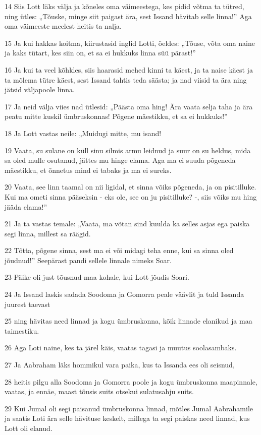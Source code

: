 \par 14 Siis Lott läks välja ja kõneles oma väimeestega, kes pidid võtma ta tütred, ning ütles: „Tõuske, minge siit paigast ära, sest Issand hävitab selle linna!” Aga oma väimeeste meelest heitis ta nalja.
\par 15 Ja kui hakkas koitma, kiirustasid inglid Lotti, öeldes: „Tõuse, võta oma naine ja kaks tütart, kes siin on, et sa ei hukkuks linna süü pärast!”
\par 16 Ja kui ta veel kõhkles, siis haarasid mehed kinni ta käest, ja ta naise käest ja ta mõlema tütre käest, sest Issand tahtis teda säästa; ja nad viisid ta ära ning jätsid väljapoole linna.
\par 17 Ja neid välja viies nad ütlesid: „Päästa oma hing! Ära vaata selja taha ja ära peatu mitte kuskil ümbruskonnas! Põgene mäestikku, et sa ei hukkuks!”
\par 18 Ja Lott vastas neile: „Muidugi mitte, mu isand!
\par 19 Vaata, su sulane on küll sinu silmis armu leidnud ja suur on su heldus, mida sa oled mulle osutanud, jättes mu hinge elama. Aga ma ei suuda põgeneda mäestikku, et õnnetus mind ei tabaks ja ma ei sureks.
\par 20 Vaata, see linn taamal on nii ligidal, et sinna võiks põgeneda, ja on pisitilluke. Kui ma ometi sinna pääseksin - eks ole, see on ju pisitilluke? -, siis võiks mu hing jääda elama!”
\par 21 Ja ta vastas temale: „Vaata, ma võtan sind kuulda ka selles asjas ega paiska segi linna, millest sa räägid.
\par 22 Tõtta, põgene sinna, sest ma ei või midagi teha enne, kui sa sinna oled jõudnud!” Seepärast pandi sellele linnale nimeks Soar.
\par 23 Päike oli just tõusnud maa kohale, kui Lott jõudis Soari.
\par 24 Ja Issand laskis sadada Soodoma ja Gomorra peale väävlit ja tuld Issanda juurest taevast
\par 25 ning hävitas need linnad ja kogu ümbruskonna, kõik linnade elanikud ja maa taimestiku.
\par 26 Aga Loti naine, kes ta järel käis, vaatas tagasi ja muutus soolasambaks.
\par 27 Ja Aabraham läks hommikul vara paika, kus ta Issanda ees oli seisnud,
\par 28 heitis pilgu alla Soodoma ja Gomorra poole ja kogu ümbruskonna maapinnale, vaatas, ja ennäe, maast tõusis suits otsekui sulatusahju suits.
\par 29 Kui Jumal oli segi paisanud ümbruskonna linnad, mõtles Jumal Aabrahamile ja saatis Loti ära selle hävituse keskelt, millega ta segi paiskas need linnad, kus Lott oli elanud.
